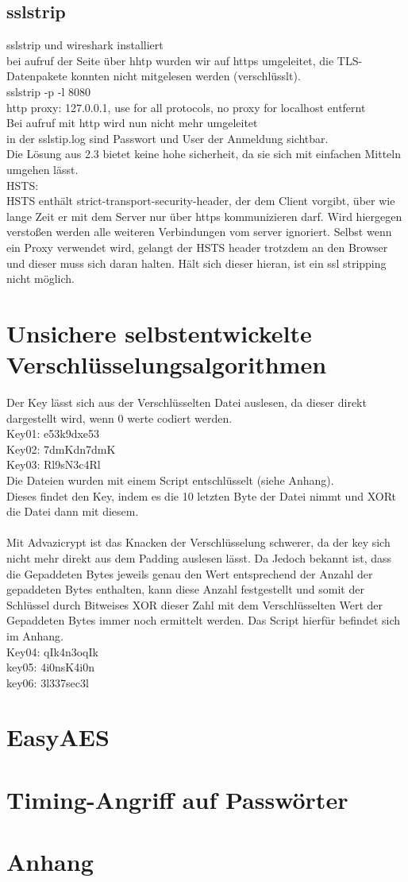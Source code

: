 \documentclass[12pt]{article}
\theoremstyle{plain}
\begin{document}
\subsection{sslstrip}
sslstrip und wireshark installiert\\
bei aufruf der Seite über hhtp wurden wir auf https umgeleitet, die TLS-Datenpakete konnten nicht mitgelesen werden (verschlüsslt).\\
sslstrip -p -l 8080\\
http proxy: 127.0.0.1, use for all protocols, no proxy for localhost entfernt\\
Bei aufruf mit http wird nun nicht mehr umgeleitet\\
in der sslstip.log sind Passwort und User der Anmeldung sichtbar.\\
Die Lösung aus 2.3 bietet keine hohe sicherheit, da sie sich mit einfachen Mitteln umgehen lässt.\\
HSTS:\\
HSTS enthält strict-transport-security-header, der dem Client vorgibt, über wie lange Zeit er mit dem Server nur über https kommunizieren darf. Wird hiergegen verstoßen werden alle weiteren Verbindungen vom server ignoriert. Selbst wenn ein Proxy verwendet wird, gelangt der HSTS header trotzdem an den Browser und dieser muss sich daran halten. Hält sich dieser hieran, ist ein ssl stripping nicht möglich.
\section{Unsichere selbstentwickelte Verschlüsselungsalgorithmen}
Der Key lässt sich aus der Verschlüsselten Datei auslesen, da dieser direkt dargestellt wird, wenn 0 werte codiert werden.\\
Key01: e53k9dxe53\\
Key02: 7dmKdn7dmK\\
Key03: Rl9sN3c4Rl\\
Die Dateien wurden mit einem Script entschlüsselt (siehe Anhang).\\
Dieses findet den Key, indem es die 10 letzten Byte der Datei nimmt und XORt die Datei dann mit diesem.\\\\
Mit Advazicrypt ist das Knacken der Verschlüsselung schwerer, da der key sich nicht mehr direkt aus dem Padding auslesen lässt. Da Jedoch bekannt ist, dass die Gepaddeten Bytes jeweils genau den Wert entsprechend der Anzahl der gepaddeten Bytes enthalten, kann diese Anzahl festgestellt und somit der Schlüssel durch Bitweises XOR dieser Zahl mit dem Verschlüsselten Wert der Gepaddeten Bytes immer noch ermittelt werden. Das Script hierfür befindet sich im Anhang.\\
Key04: qIk4n3oqIk\\
key05: 4i0nsK4i0n\\
key06: 3l337sec3l\\
\section{EasyAES}

\section{Timing-Angriff auf Passwörter}
\section{Anhang}
\end{document}
